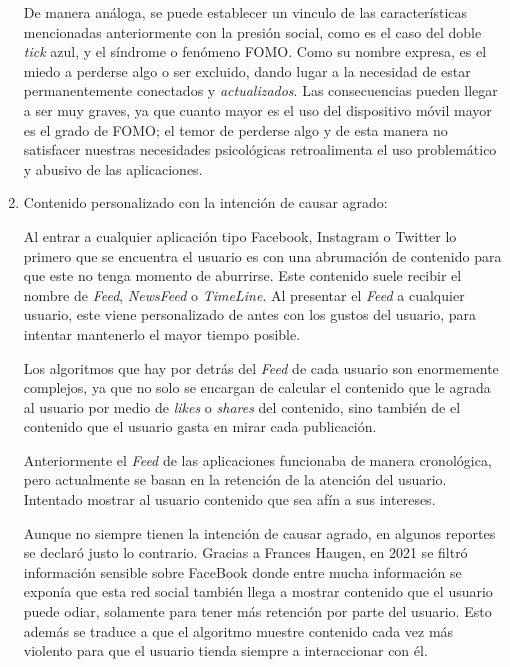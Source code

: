 \begin{enumerate}
    De manera análoga, se puede establecer un vinculo de las características mencionadas anteriormente con la presión social, como es el caso del doble \textit{tick} azul, y el síndrome o fenómeno \ac{FOMO}. Como su nombre expresa, es el miedo a perderse algo o ser excluido, dando lugar a la necesidad de estar permanentemente conectados y \textit{actualizados}. Las consecuencias pueden llegar a ser muy graves, ya que cuanto mayor es el uso del dispositivo móvil mayor es el grado de \acs{FOMO}; el temor de perderse algo y de esta manera no satisfacer nuestras necesidades psicológicas retroalimenta el uso problemático y abusivo de las aplicaciones. \cite{Adiccion-RRSS-FOMO}

    \item Contenido personalizado con la intención de causar agrado:

    Al entrar a cualquier aplicación tipo Facebook, Instagram o Twitter lo primero que se encuentra el usuario es con una abrumación de contenido para que este no tenga momento de aburrirse. Este contenido suele recibir el nombre de \textit{Feed}, \textit{NewsFeed} o \textit{TimeLine}. Al presentar el \textit{Feed} a cualquier usuario, este viene personalizado de antes con los gustos del usuario, para intentar mantenerlo el mayor tiempo posible.

    Los algoritmos que hay por detrás del \textit{Feed} de cada usuario son enormemente complejos, ya que no solo se encargan de calcular el contenido que le agrada al usuario por medio de \textit{likes} o \textit{shares} del contenido, sino también de el contenido que el usuario gasta en mirar cada publicación.

    Anteriormente el \textit{Feed} de las aplicaciones funcionaba de manera cronológica, pero actualmente se basan en la retención de la atención del usuario. Intentado mostrar al usuario contenido que sea afín a sus intereses. \cite{Adiccion-RRSS-Edgerank}

    Aunque no siempre tienen la intención de causar agrado, en algunos reportes se declaró justo lo contrario. Gracias a Frances Haugen, en 2021 se filtró información sensible sobre FaceBook donde entre mucha información se exponía que esta red social también llega a mostrar contenido que el usuario puede odiar, solamente para tener más retención por parte del usuario. \cite{Adiccion-RRSS-Odias} Esto además se traduce a que el algoritmo muestre contenido cada vez más violento para que el usuario tienda siempre a interaccionar con él.
    

\end{enumerate}

